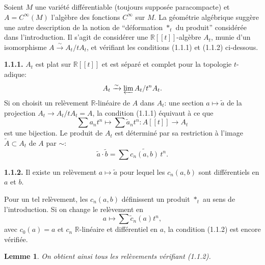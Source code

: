 \documentclass[11pt,a4paper]{article}
\theoremstyle{plain}
\newtheorem{lemma}[theorem]{Lemme}
\theoremstyle{definition}
\newcommand{\R}{\mathbb{R}}
\newcommand{\iso}{\xrightarrow{\sim}}
\begin{document}
\subsection{}

Soient $M$ une vari\'et\'e diff\'erentiable (toujours suppos\'ee paracompacte) et
$A = C^{\infty}(M)$ l'alg\`ebre des fonctions $C^{\infty}$ sur $M$. La g\'eom\'etrie alg\'ebrique sugg\`ere
une autre description de la notion de ``d\'eformation $*_{t}$ du produit'' consid\'er\'ee dans
l'introduction. Il s'agit de consid\'erer une $\R[[t]]$-alg\`ebre $A_{t}$, munie d'un isomorphisme
$A \iso A_{t}/tA_{t}$, et v\'erifiant les conditions (1.1.1) et (1.1.2) ci-dessous.

\medskip
\noindent \textbf{1.1.1.} $A_{t}$ est plat sur $\R[[t]]$ et est s\'epar\'e et complet pour la topologie $t$-adique:
\[
A_{t} \iso \varprojlim A_{t}/t^{n}A_{t}.
\]
Si on choisit un rel\`evement $\R$-lin\'eaire de $A$ dans $A_{t}$: une section $a \mapsto \tilde{a}$ de la
projection $A_{t} \to A_{t}/tA_{t} = A$, la condition (1.1.1) \'equivaut \`a ce que
\[
\sum a_{n} t^{n} \longmapsto \sum \tilde{a}_{n} t^{n} : A[[t]] \longrightarrow A_{t}
\]
est une bijection. Le produit de $A_{t}$ est d\'etermin\'e par sa restriction \`a l'image $\tilde{A} \subset A_{t}$
de $A$ par $\sim$:
\[
\tilde{a} \cdot \tilde{b} = \sum \widetilde{c_{n}(a,b)}\, t^{n}.
\]

\medskip
\noindent \textbf{1.1.2.} Il existe un rel\`evement $a \mapsto \tilde{a}$ pour lequel les $c_{n}(a, b)$ sont diff\'erentiels en $a$
et $b$.

\medskip
Pour un tel rel\`evement, les $c_{n}(a, b)$ d\'efinissent un produit $*_{t}$ au sens de
l'introduction. Si on change le rel\`evement en
\begin{equation}
a \longmapsto \sum \tilde{c}_{n}(a) t^{n}, \tag{1.1.3}
\end{equation}
avec $c_{0}(a) = a$ et $c_{n}$ $\R$-lin\'eaire et diff\'erentiel en $a$, la condition (1.1.2) est encore
v\'erifi\'ee.

\begin{lemma}
On obtient ainsi tous les rel\`evements v\'erifiant \emph{(1.1.2)}.
\end{lemma}
\end{document}
